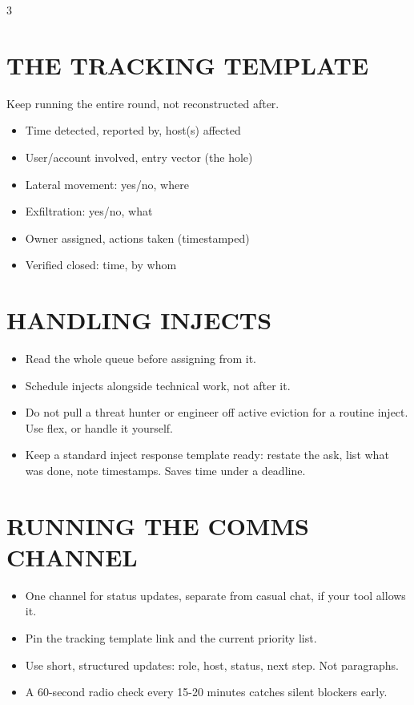 \documentclass[7pt,landscape]{article}
\begin{document}
\begin{multicols*}{3}
\section{THE TRACKING TEMPLATE}
Keep running the entire round, not reconstructed after.
\begin{itemize}
    \item Time detected, reported by, host(s) affected
    \item User/account involved, entry vector (the hole)
    \item Lateral movement: yes/no, where
    \item Exfiltration: yes/no, what
    \item Owner assigned, actions taken (timestamped)
    \item Verified closed: time, by whom
\end{itemize}

\section{HANDLING INJECTS}
\begin{itemize}
    \item Read the whole queue before assigning from it.
    \item Schedule injects alongside technical work, not after it.
    \item Do not pull a threat hunter or engineer off active eviction for a routine inject. Use flex, or handle it yourself.
    \item Keep a standard inject response template ready: restate the ask, list what was done, note timestamps. Saves time under a deadline.
\end{itemize}

\section{RUNNING THE COMMS CHANNEL}
\begin{itemize}
    \item One channel for status updates, separate from casual chat, if your tool allows it.
    \item Pin the tracking template link and the current priority list.
    \item Use short, structured updates: role, host, status, next step. Not paragraphs.
    \item A 60-second radio check every 15-20 minutes catches silent blockers early.
\end{itemize}


\end{multicols*}
\end{document}
